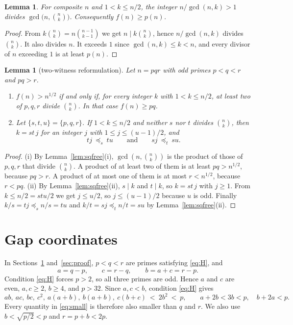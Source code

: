 \documentclass[11pt,a4paper]{article}
\newtheorem{lemma}[theorem]{Lemma}
\theoremstyle{definition}
\newcommand{\dom}[1]{\preceq_{#1}}
\newcommand{\bin}[2]{\binom{#1}{#2}}
\begin{document}
\begin{lemma}\label{lem:lower}
For composite $n$ and $1<k\le n/2$, the integer $n/\gcd(n,k)>1$ divides $\gcd\bigl(n,\bin nk\bigr)$. Consequently $f(n)\ge p(n)$.
\end{lemma}
\begin{proof}
From $k\bin nk=n\bin{n-1}{k-1}$ we get $n\mid k\bin nk$, hence $n/\gcd(n,k)$ divides $\bin nk$. It also divides $n$. It exceeds $1$ since $\gcd(n,k)\le k<n$, and every divisor of $n$ exceeding $1$ is at least $p(n)$.
\end{proof}

\begin{lemma}[two-witness reformulation]\label{lem:two}
Let $n=pqr$ with odd primes $p<q<r$ and $pq>r$.
\begin{enumerate}[label=\textup{(\roman*)}]
\item $f(n)>n^{1/2}$ if and only if, for every integer $k$ with $1<k\le n/2$, at least two of $p,q,r$ divide $\bin nk$. In that case $f(n)\ge pq$.
\item Let $\{s,t,u\}=\{p,q,r\}$. If $1<k\le n/2$ and neither $s$ nor $t$ divides $\bin nk$, then $k=st\,j$ for an integer $j$ with $1\le j\le (u-1)/2$, and
\[
tj\ \dom s\ tu\qquad\text{and}\qquad sj\ \dom t\ su .
\]
\end{enumerate}
\end{lemma}
\begin{proof}
(i) By Lemma~\ref{lem:sqfree}(i), $\gcd(n,\bin nk)$ is the product of those of $p,q,r$ that divide $\bin nk$. A product of at least two of them is at least $pq>n^{1/2}$, because $pq>r$. A product of at most one of them is at most $r<n^{1/2}$, because $r<pq$.
(ii) By Lemma~\ref{lem:sqfree}(ii), $s\mid k$ and $t\mid k$, so $k=st\,j$ with $j\ge1$. From $k\le n/2=stu/2$ we get $j\le u/2$, so $j\le(u-1)/2$ because $u$ is odd. Finally $k/s=tj\dom s n/s=tu$ and $k/t=sj\dom t n/t=su$ by Lemma~\ref{lem:sqfree}(ii).
\end{proof}

\section{Gap coordinates}\label{sec:gap}

In Sections~\ref{sec:gap} and~\ref{sec:proof}, $p<q<r$ are primes satisfying \eqref{eq:H}, and
\[
a=q-p,\qquad c=r-q,\qquad b=a+c=r-p .
\]
Condition \eqref{eq:H} forces $p>2$, so all three primes are odd. Hence $a$ and $c$ are even, $a,c\ge2$, $b\ge4$, and $p>32$. Since $a,c<b$, condition \eqref{eq:H} gives
\begin{equation}\label{eq:small}
ab,\ ac,\ bc,\ c^2,\ a(a+b),\ b(a+b),\ c(b+c)\ <\ 2b^2\ <\ p,\qquad a+2b<3b<p,\quad b+2a<p .
\end{equation}
Every quantity in \eqref{eq:small} is therefore also smaller than $q$ and $r$. We also use $b<\sqrt{p/2}<p$ and $r=p+b<2p$.
\end{document}
